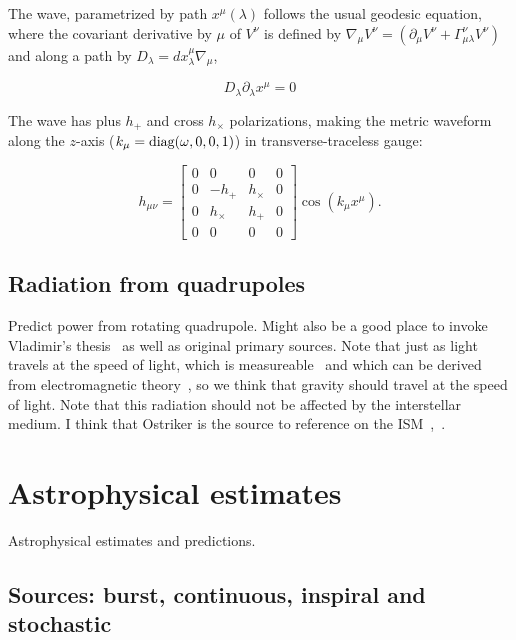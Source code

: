 The wave, parametrized by path $x^\mu (\lambda)$ follows the usual geodesic equation, where the covariant derivative by $\mu$ of $V^\nu$ is defined by $\nabla_\mu V^\nu = (\partial_\mu V^\nu + \Gamma^\nu_{\mu\lambda} V^\nu)$ and along a path by $D_\lambda = dx^\mu_\lambda \nabla_\mu$,

\begin{equation}
D_\lambda \partial_\lambda x^\mu = 0
\end{equation}

The wave has plus $h_+$ and cross $h_\times$ polarizations, making the metric waveform along the $z$-axis ($k_\mu = \textup{diag}(\omega,0,0,1)$) in transverse-traceless gauge:

\begin{equation}
h_{\mu\nu} =
\left[
\begin{array}{cccc}
0 & 0 & 0 & 0\\
0 & -h_+ & h_\times & 0 \\
0 & h_\times & h_+ & 0\\
0 & 0 & 0 & 0
\end{array} \right] \cos \left(k_\mu x^\mu \right).
\end{equation}



        \subsection{Radiation from quadrupoles}
        \label{radiation}
  
            Predict power from rotating quadrupole. Might also be a good place to invoke Vladimir's thesis~\cite{DergachevThesis} as well as original primary sources. Note that just as light travels at the speed of light, which is measureable~\cite{CODATA} and which can be derived from electromagnetic theory~\cite{GriffithsE}, so we think that gravity should travel at the speed of light. Note that this radiation should not be affected by the interstellar medium. I think that Ostriker is the source to reference on the ISM~\cite{Caldwell1981},~\cite{McKee1977}.

    \section{Astrophysical estimates}
    \label{estimates}

        Astrophysical estimates and predictions.

        \subsection{Sources: burst, continuous, inspiral and stochastic}
        \label{source_types}

